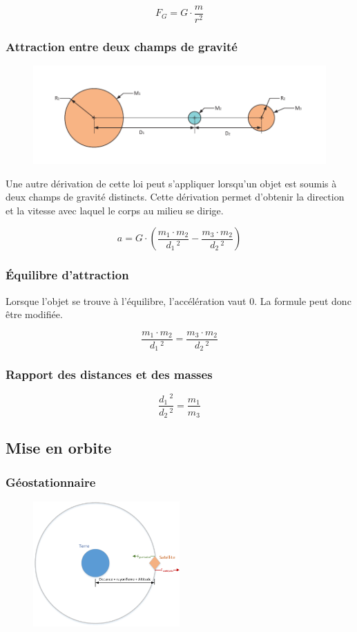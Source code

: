 \documentclass[12pt,a4paper]{article} %
\begin{document}
	\[F_G = G\cdot\frac{m}{r^2}\]

\subsubsection*{Attraction entre deux champs de gravité}
\begin{figure}[h]
	\centering
	\includegraphics{Newton-Gravitation-2Planetes}
\end{figure}
Une autre dérivation de cette loi peut s'appliquer lorsqu'un objet est soumis à deux champs de gravité distincts. Cette dérivation permet d'obtenir la direction et la vitesse avec laquel le corps au milieu se dirige.

	\[a = G \cdot \left(\frac{m_1 \cdot m_2}{d_1\,^2} - \frac{m_3 \cdot m_2}{d_2\,^2}\right)\]

\subsubsection*{Équilibre d'attraction}
Lorsque l'objet se trouve à l'équilibre, l'accélération vaut 0. La formule peut donc être modifiée.

	\[\frac{m_1 \cdot m_2}{d_1\,^2} = \frac{m_3 \cdot m_2}{d_2\,^2}\]

\subsubsection*{Rapport des distances et des masses}
	\[\frac{d_1\,^2}{d_2\, ^2} = \frac{m_1}{m_3}\]

\newpage

\subsection{Mise en orbite}

\subsubsection*{Géostationnaire}
\begin{figure}[h]
	\centering
	\includegraphics[width=0.5\textwidth]{Newton-OrbiteGeostationnaire}
\end{figure}
\end{document}
